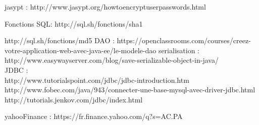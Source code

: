 jasypt :
http://www.jasypt.org/howtoencryptuserpasswords.html

Fonctions SQL:
http://sql.sh/fonctions/sha1

http://sql.sh/fonctions/md5
DAO :
https://openclassrooms.com/courses/creez-votre-application-web-avec-java-ee/le-modele-dao
serialisation : 
http://www.easywayserver.com/blog/save-serializable-object-in-java/ \\

JDBC : \\
http://www.tutorialspoint.com/jdbc/jdbc-introduction.htm\\
http://www.fobec.com/java/943/connecter-une-base-mysql-avec-driver-jdbc.html
http://tutorials.jenkov.com/jdbc/index.html

yahooFinance : 
https://fr.finance.yahoo.com/q?s=AC.PA